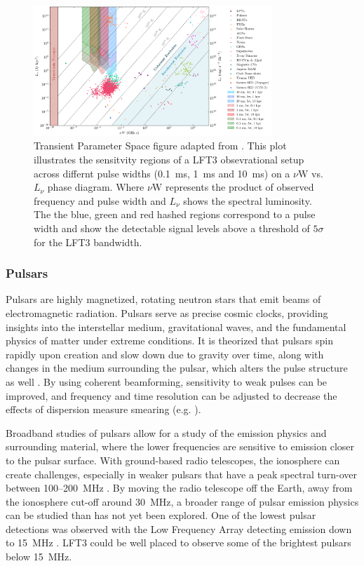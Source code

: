 \begin{figure}[!ht]
    \centering
    \includegraphics[width=0.8\textwidth]{figures/phase_space.png} %
    \caption{Transient Parameter Space figure adapted from \citet{pietka}. This plot illustrates the sensitvity regions of a LFT3 obsevrational setup across differnt pulse widths (0.1~ms, 1~ms and 10~ms) on a $\nu \text{W}$ vs. $L_\nu$ phase diagram. Where $\nu \text{W}$ represents the product of observed frequency and pulse width and $L_\nu$ shows the spectral luminosity. The the blue, green and red hashed regions correspond to a pulse width and show the detectable signal levels above a threshold of $5\sigma$ for the LFT3 bandwidth.}
    \label{fig:placeholder}
\end{figure}

\subsubsection{Pulsars}
Pulsars are highly magnetized, rotating neutron stars that emit beams of electromagnetic radiation. Pulsars serve as precise cosmic clocks, providing insights into the interstellar medium, gravitational waves, and the fundamental physics of matter under extreme conditions. It is theorized that pulsars spin rapidly upon creation and slow down due to gravity over time, along with changes in the medium surrounding the pulsar, which alters the pulse structure as well \citep{LW_2013}. By using coherent beamforming, sensitivity to weak pulses can be improved, and frequency and time resolution can be adjusted to decrease the effects of dispersion measure smearing (e.g. \cite{WL_2020}).

Broadband studies of pulsars allow for a study of the emission physics and surrounding material, where the lower frequencies are sensitive to emission closer to the pulsar surface. With ground-based radio telescopes, the ionosphere can create challenges, especially in weaker pulsars that have a peak spectral turn-over between 100--200~MHz \citep{Stappers_2011}. By moving the radio telescope off the Earth, away from the ionosphere cut-off around 30~MHz, a broader range of pulsar emission physics can be studied than has not yet been explored. One of the lowest pulsar detections was observed with the Low Frequency Array detecting emission down to 15~MHz \citep{Kondratiev_2012}. LFT3 could be well placed to observe some of the brightest pulsars below 15~MHz. 


